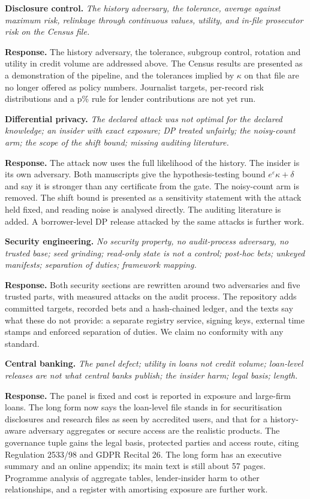 \documentclass[11pt,a4paper]{article}
\newcommand{\point}[2]{\par\medskip\textbf{#1} \emph{#2}\par}
\newcommand{\reply}{\textbf{Response.} }
\begin{document}
\point{Disclosure control.}{The history adversary, the tolerance, average against maximum risk, relinkage through continuous values, utility, and in-file prosecutor risk on the Census file.}
\reply The history adversary, the tolerance, subgroup control, rotation and utility in credit volume are addressed above. The Census results are presented as a demonstration of the pipeline, and the tolerances implied by $\kappa$ on that file are no longer offered as policy numbers. Journalist targets, per-record risk distributions and a p\% rule for lender contributions are not yet run.

\point{Differential privacy.}{The declared attack was not optimal for the declared knowledge; an insider with exact exposure; DP treated unfairly; the noisy-count arm; the scope of the shift bound; missing auditing literature.}
\reply The attack now uses the full likelihood of the history. The insider is its own adversary. Both manuscripts give the hypothesis-testing bound $e^\varepsilon\kappa+\delta$ and say it is stronger than any certificate from the gate. The noisy-count arm is removed. The shift bound is presented as a sensitivity statement with the attack held fixed, and reading noise is analysed directly. The auditing literature is added. A borrower-level DP release attacked by the same attacks is further work.

\point{Security engineering.}{No security property, no audit-process adversary, no trusted base; seed grinding; read-only state is not a control; post-hoc bets; unkeyed manifests; separation of duties; framework mapping.}
\reply Both security sections are rewritten around two adversaries and five trusted parts, with measured attacks on the audit process. The repository adds committed targets, recorded bets and a hash-chained ledger, and the texts say what these do not provide: a separate registry service, signing keys, external time stamps and enforced separation of duties. We claim no conformity with any standard.

\point{Central banking.}{The panel defect; utility in loans not credit volume; loan-level releases are not what central banks publish; the insider harm; legal basis; length.}
\reply The panel is fixed and cost is reported in exposure and large-firm loans. The long form now says the loan-level file stands in for securitisation disclosures and research files as seen by accredited users, and that for a history-aware adversary aggregates or secure access are the realistic products. The governance tuple gains the legal basis, protected parties and access route, citing Regulation 2533/98 and GDPR Recital 26. The long form has an executive summary and an online appendix; its main text is still about 57 pages. Programme analysis of aggregate tables, lender-insider harm to other relationships, and a register with amortising exposure are further work.
\end{document}
